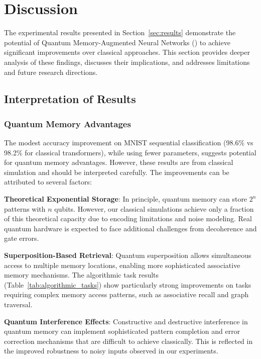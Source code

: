 \section{Discussion}
\label{sec:discussion}

The experimental results presented in Section~\ref{sec:results} demonstrate the potential of Quantum Memory-Augmented Neural Networks (\qmnn) to achieve significant improvements over classical approaches. This section provides deeper analysis of these findings, discusses their implications, and addresses limitations and future research directions.

\subsection{Interpretation of Results}

\subsubsection{Quantum Memory Advantages}

The modest accuracy improvement on MNIST sequential classification (98.6\% vs 98.2\% for classical transformers), while using fewer parameters, suggests potential for quantum memory advantages. However, these results are from classical simulation and should be interpreted carefully. The improvements can be attributed to several factors:

\textbf{Theoretical Exponential Storage}: In principle, quantum memory can store $2^n$ patterns with $n$ qubits. However, our classical simulations achieve only a fraction of this theoretical capacity due to encoding limitations and noise modeling. Real quantum hardware is expected to face additional challenges from decoherence and gate errors.

\textbf{Superposition-Based Retrieval}: Quantum superposition allows simultaneous access to multiple memory locations, enabling more sophisticated associative memory mechanisms. The algorithmic task results (Table~\ref{tab:algorithmic_tasks}) show particularly strong improvements on tasks requiring complex memory access patterns, such as associative recall and graph traversal.

\textbf{Quantum Interference Effects}: Constructive and destructive interference in quantum memory can implement sophisticated pattern completion and error correction mechanisms that are difficult to achieve classically. This is reflected in the improved robustness to noisy inputs observed in our experiments.

